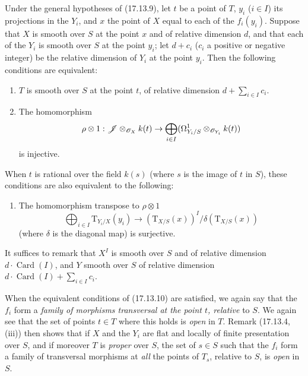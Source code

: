\begin{corollary}[17.13.10]\label{IV.17.13.10}
Under the general hypotheses of (17.13.9), let $t$ be a point of $T$, $y_i$ ($i\in I$) its projections in the $Y_i$, and $x$ the point of $X$ equal to each of the $f_i(y_i)$. Suppose that $X$ is smooth over $S$ at the point $x$ and of relative dimension $d$, and that each of the $Y_i$ is smooth over $S$ at the point $y_i$; let $d+c_i$ ($c_i$ a positive or negative integer) be the relative dimension of $Y_i$ at the point $y_i$. Then the following conditions are equivalent:


\begin{enumerate}
  \item[a)] $T$ is smooth over $S$ at the point $t$, of relative dimension $d+\sum_{i\in I}c_i$.
  \item[b)] The homomorphism
  \[
  \rho\otimes1:\mathscr{J}\otimes_{\mathscr{O}_X}k(t)\to\bigoplus_{i\in I}(\Omega^1_{Y_i/S}\otimes_{\mathscr{O}_{Y_i}}k(t))
  \]
  is injective.
\end{enumerate}
When $t$ is rational over the field $k(s)$ (where $s$ is the image of $t$ in $S$), these conditions are also equivalent to the following:
\begin{enumerate}
  \item[b')] The homomorphism transpose to $\rho\otimes1$
  \[
  \bigoplus_{i\in I}\mathrm{T}_{Y_i/X}(y_i)\to(\mathrm{T}_{X/S}(x))^I/\delta(\mathrm{T}_{X/S}(x))
  \]
  (where $\delta$ is the diagonal map) is surjective.
\end{enumerate}
It suffices to remark that $X^I$ is smooth over $S$ and of relative dimension $d\cdot\operatorname{Card}(I)$, and $Y$ smooth over $S$ of relative dimension $d\cdot\operatorname{Card}(I)+\sum_{i\in I}c_i$.

When the equivalent conditions of (17.13.10) are satisfied, we again say that the $f_i$ form a \emph{family of morphisms transversal at the point $t$, relative} to $S$. We again see that the set of points $t\in T$ where this holds is \emph{open} in $T$. Remark (17.13.4, (iii)) then shows that if $X$ and the $Y_i$ are flat and locally of finite presentation over $S$, and if moreover $T$ is \emph{proper} over $S$, the set of $s\in S$ such that the $f_i$ form a family of transversal morphisms at \emph{all} the points of $T_s$, relative to $S$, is \emph{open} in $S$.
\end{corollary}


